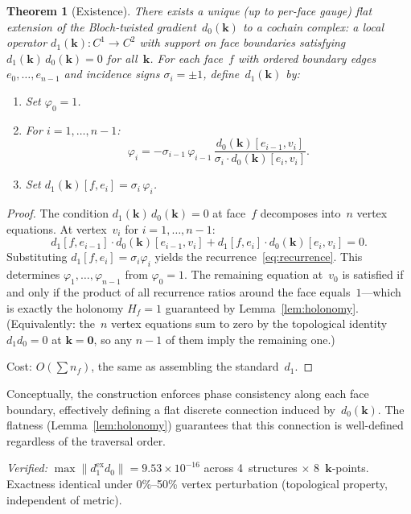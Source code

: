 \documentclass[12pt]{article}
\newtheorem{theorem}{Theorem}[section]
\theoremstyle{definition}
\theoremstyle{remark}
\newcommand{\kk}{\mathbf{k}}
\begin{document}
\begin{theorem}[Existence]\label{thm:existence}
There exists a unique (up to per-face gauge) flat extension of the
Bloch-twisted gradient~$d_0(\kk)$ to a cochain complex: a local operator
$d_1(\kk)\colon C^1 \to C^2$ with support on face boundaries satisfying
$d_1(\kk)\,d_0(\kk) = 0$ for all~$\kk$. For each
face~$f$ with ordered boundary edges $e_0, \ldots, e_{n-1}$ and incidence
signs $\sigma_i = \pm 1$, define~$d_1(\kk)$ by:
\begin{enumerate}
  \item Set $\varphi_0 = 1$.
  \item For $i = 1, \ldots, n{-}1$:
  \begin{equation}\label{eq:recurrence}
    \varphi_i = -\sigma_{i-1}\,\varphi_{i-1}\,
    \frac{d_0(\kk)[e_{i-1}, v_i]}{\sigma_i \cdot d_0(\kk)[e_i, v_i]}.
  \end{equation}
  \item Set $d_1(\kk)[f, e_i] = \sigma_i\,\varphi_i$.
\end{enumerate}
\end{theorem}

\begin{proof}
The condition $d_1(\kk)\,d_0(\kk) = 0$ at face~$f$ decomposes into~$n$ vertex
equations. At vertex~$v_i$ for $i = 1, \ldots, n{-}1$:
\[
  d_1[f, e_{i-1}] \cdot d_0(\kk)[e_{i-1}, v_i]
  + d_1[f, e_i] \cdot d_0(\kk)[e_i, v_i] = 0.
\]
Substituting $d_1[f, e_i] = \sigma_i\varphi_i$ yields the
recurrence~\eqref{eq:recurrence}. This determines $\varphi_1, \ldots,
\varphi_{n-1}$ from $\varphi_0 = 1$. The remaining equation at~$v_0$ is
satisfied if and only if the product of all recurrence ratios around the face
equals~$1$---which is exactly the holonomy $H_f = 1$ guaranteed by
Lemma~\ref{lem:holonomy}. (Equivalently: the~$n$ vertex equations sum to zero
by the topological identity $d_1 d_0 = 0$ at $\kk = \mathbf{0}$, so any
$n{-}1$ of them imply the remaining one.)

Cost: $O(\sum n_f)$, the same as assembling the standard~$d_1$.
\end{proof}

Conceptually, the construction enforces phase consistency along each face
boundary, effectively defining a flat discrete connection induced
by~$d_0(\kk)$. The flatness (Lemma~\ref{lem:holonomy}) guarantees that this
connection is well-defined regardless of the traversal order.

\emph{Verified:} $\max\|d_1^{\mathrm{ex}} d_0\| = 9.53 \times 10^{-16}$
across 4~structures $\times$ 8~$\kk$-points. Exactness identical under
0\%--50\% vertex perturbation (topological property, independent of metric).
\end{document}
